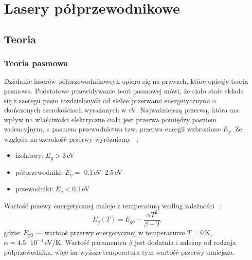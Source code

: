 \chapter{Lasery półprzewodnikowe}
\section{Teoria}
\subsection{Teoria pasmowa}
Działanie laserów półprzewodnikowcyh opiera się na prawach, które opisuje teoria pasmowa.
Podstatowe przewidywanie teori pasmowej mówi, że ciało stałe składa się z szeregu pasm rozdzielonych od siebie
 przerwami energetycznymi o skończonych szerokościach wyrażanych w eV. Najważniejszą przerwą, która ma wpływ na właściwości elektryczne ciała jest
 przerwa pomiędzy pasmem walencyjnym, a pasmem przewodnictwa tzw. przerwa energii wzbronione $E_g$. Ze względu na szerokość przerwy
  wyrózniamy ~\cite{laser_book}:
\begin{itemize}
\item izolatory: $E_g > 3$\,eV
\item półprzewodniki: $E_g =$ 0.1\,eV--2.5\,eV
\item przewodniki: $E_g<$0.1\,eV
\end{itemize}
Wartość przewy energetycznej maleje z temperaturą według zależności ~\cite{laser_book}:
\begin{equation}
E_g(T) = E_{g0} - \frac{\alpha T^2}{\beta + T}
\end{equation}
gdzie: $E_{g0}$ --- wartooś przerwy energetycznej w temperaturze $T=0$\,K, \\ $\alpha = 4.5 \cdot 10^{-4}$\,eV/K.
Wartość paramentru $\beta$ jest dodatnia i zależny od rodzaja półprzewodnika, więc im wyższa temperatura tym wartość przerwy mniejsza.
